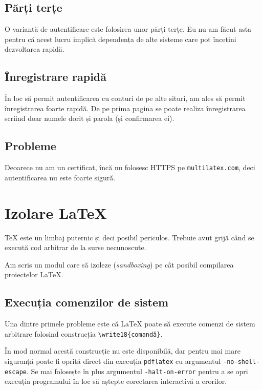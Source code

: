 \documentclass[a4wide,12pt]{report}
\newcommand{\eng}[1]{\emph{#1}} %
\newcommand{\cod}[1]{\texttt{#1}}
\newcommand{\poate}[1]{#1}
\begin{document}
\subsection{Părți terțe}

O variantă de autentificare este folosirea unor părți terțe. Eu nu am făcut asta
pentru că acest lucru implică dependența de alte sisteme care pot încetini
dezvoltarea rapidă.

\subsection{Înregistrare rapidă}
\label{inregrapsub}

În loc să permit autentificarea cu conturi de pe alte situri, am ales să permit
înregistrarea foarte rapidă. De pe prima pagina se poate realiza înregistrarea
scriind doar numele dorit și parola (și confirmarea ei).

\subsection{Probleme}

Deoarece nu am un certificat, încă nu folosesc HTTPS pe \cod{multilatex.com},
deci autentificarea nu este foarte sigură.

\section{Izolare \LaTeX}

\TeX{} este un limbaj puternic și deci posibil periculos. Trebuie avut grijă când
se execută cod arbitrar de la surse necunoscute.

Am scris un modul care să izoleze (\eng{sandboxing}) pe cât posibil compilarea
proiectelor \LaTeX{}.

\subsection{Execuția comenzilor de sistem}

Una dintre primele probleme este că \LaTeX{} poate să execute comenzi de sistem
arbitrare folosind construcția \cod{\textbackslash write18\{comandă\}}.

În mod normal acestă construcție nu este disponibilă, dar pentru mai mare
siguranță poate fi oprită direct din execuția \cod{pdflatex} cu argumentul
\cod{-no-shell-escape}. \poate{Se mai folosește în plus argumentul
\cod{-halt-on-error} pentru a se opri execuția programului în loc să aștepte
corectarea interactivă a erorilor.}
\end{document}

